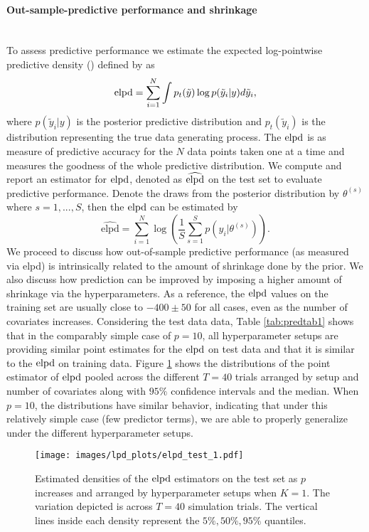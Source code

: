 \paragraph{Out-sample-predictive performance and shrinkage}\mbox{}\\

To assess predictive performance we estimate the expected log-pointwise predictive density (\elpd) defined by \cite{AkiSurvey} as
%
\[ \text{elpd}=  \sum_{i=1}^N \int p_t(\tilde{y})\log p(\tilde{y}_i|y) d\tilde{y}_i ,  \]
%
where $p(\tilde{y}_i|y)$ is the posterior predictive distribution and $p_t(\tilde{y}_i)$ is the distribution representing the true data generating process. The $\text{elpd}$ is as measure of predictive accuracy for the $N$ data points taken one at a time and measures the goodness of the whole predictive distribution. We compute and report an estimator for $\text{elpd}$, denoted as $\widehat{\text{elpd}}$ on the test set to evaluate predictive performance. Denote the draws from the posterior distribution by $\theta^{(s)}$ where $s=1,...,S$, then the $\text{elpd}$ can be estimated by
\[  \widehat{\text{elpd}}= \sum_{i=1}^N \log \left(\frac{1}{S} \sum_{s=1}^S p(y_i|\theta^{(s)})  \right) .       \]
We proceed to discuss how out-of-sample predictive performance (as measured via elpd) is intrinsically related to the amount of shrinkage done by the prior. We also discuss how prediction can be improved by imposing a higher amount of shrinkage via the hyperparameters. As a reference, the $\text{elpd}$ values on the training set are usually close to $-400 \pm 50$ for all cases, even as the number of covariates increases. Considering the test data data, Table \ref{tab:predtab1} shows that in the comparably simple case of $p=10$, all hyperparameter setups are providing similar point estimates for the $\text{elpd}$ on test data and that it is similar to the $\text{elpd}$ on training data. Figure \ref{fig:lpd_test_1_ridges} shows the distributions  of the point estimator of $\text{elpd}$ pooled across the different $T=40$ trials arranged by setup and number of covariates along with $95\%$ confidence intervals and the median. When $p=10$, the distributions have similar behavior, indicating that under this relatively simple case (few predictor terms), we are able to properly generalize under the different hyperparameter setups.
 \begin{figure}[t!]%
	\centering
	\texttt{[image: images/lpd\_plots/elpd\_test\_1.pdf]}
	\caption{Estimated densities of the $\text{elpd}$ estimators on the test set as $p$ increases and arranged by hyperparameter setups when $K=1$. The variation depicted is across $T=40$ simulation trials. The vertical lines inside each density represent the $5\%, 50\%, 95\%$ quantiles.}
	\label{fig:lpd_test_1_ridges}
\end{figure}

